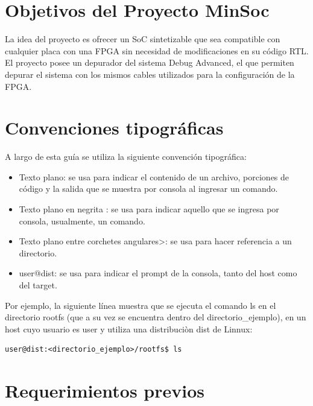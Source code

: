 
\newpage
\section{Objetivos del Proyecto MinSoc}

La idea del proyecto es ofrecer un SoC sintetizable que sea  compatible con cualquier placa con una FPGA sin necesidad de modificaciones en su código RTL. El proyecto posee un depurador del sistema Debug Advanced,  el que permiten depurar el sistema con los mismos cables utilizados para la configuración de la FPGA. 

\section{Convenciones tipográficas}

A largo de esta guía se utiliza la siguiente convención tipográfica: 

\begin{itemize}
\item Texto plano: se usa para indicar el contenido de un archivo, porciones de código y la salida que se muestra por consola al ingresar un comando.
\item Texto plano en negrita : se usa para indicar aquello que se ingresa por consola, usualmente, un comando. 
\item Texto plano entre corchetes angulares>: se usa para hacer referencia a un directorio. 
\item user@dist: se usa para indicar el prompt de la consola, tanto del host como del target. 
\end{itemize} 
 
Por ejemplo, la siguiente línea muestra que se ejecuta el comando ls en el directorio rootfs (que a  su vez se encuentra dentro del directorio\_ejemplo), en un host cuyo usuario es user y utiliza una distribuciòn dist de Linnux:


\begin{lstlisting}[breaklines]
user@dist:<directorio_ejemplo>/rootfs$ ls
\end{lstlisting}

\section{Requerimientos previos}

